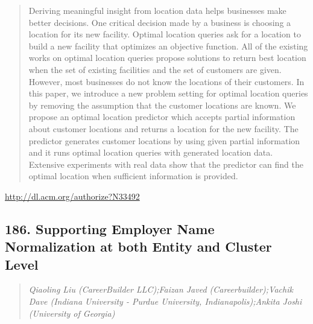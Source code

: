 \documentclass{article}
\begin{document}
\begin{quote}
Deriving meaningful insight from location data helps businesses make better decisions. One critical decision made by a business is choosing a location for its new facility. Optimal location queries ask for a location to build a new facility that optimizes an objective function. All of the existing works on optimal location queries propose solutions to return best location when the set of existing facilities and the set of customers are given. However, most businesses do not know the locations of their customers. In this paper, we introduce a new problem setting for optimal location queries by removing the assumption that the customer locations are known. We propose an optimal location predictor which accepts partial information about customer locations and returns a location for the new facility. The predictor generates customer locations by using given partial information and it runs optimal location queries with generated location data. Extensive experiments with real data show that the predictor can find the optimal location when sufficient information is provided.
\end{quote}

\href{http://dl.acm.org/authorize?N33492}{http://dl.acm.org/authorize?N33492}

\subsection{186. Supporting Employer Name Normalization at both Entity and Cluster Level}

\begin{quote}
\footnotesize{\textit{Qiaoling Liu (CareerBuilder LLC);Faizan Javed (Careerbuilder);Vachik Dave (Indiana University - Purdue University, Indianapolis);Ankita Joshi (University of Georgia)}}

\end{quote}
\end{document}
